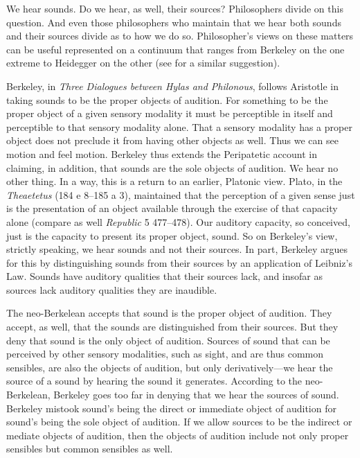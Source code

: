 We hear sounds. Do we hear, as well, their sources? Philosophers divide on this question. And even those philosophers who maintain that we hear both sounds and their sources divide as to how we do so. Philosopher's views on these matters can be useful represented on a continuum that ranges from Berkeley on the one extreme to Heidegger on the other (see \citealt{Leddington:2014aa} for a similar suggestion). 

\nocite{Berkeley:1734fk} Berkeley, in \emph{Three Dialogues between Hylas and Philonous}, follows Aristotle in taking sounds to be the proper objects of audition. For something to be the proper object of a given sensory modality it must be perceptible in itself and perceptible to that sensory modality alone. That a sensory modality has a proper object does not preclude it from having other objects as well. Thus we can see motion and feel motion. Berkeley thus extends the Peripatetic account in claiming, in addition, that sounds are the sole objects of audition. We hear no other thing. In a way, this is a return to an earlier, Platonic view. Plato, in the \emph{Theaetetus} (184 e 8--185 a 3), maintained that the perception of a given sense just is the presentation of an object available through the exercise of that capacity alone (compare as well \emph{Republic} 5 477--478). Our auditory capacity, so conceived, just is the capacity to present its proper object, sound. So on Berkeley's view, strictly speaking, we hear sounds and not their sources. In part, Berkeley argues for this by distinguishing sounds from their sources by an application of Leibniz's Law. Sounds have auditory qualities that their sources lack, and insofar as sources lack auditory qualities they are inaudible. 

The neo-Berkelean accepts that sound is the proper object of audition. They accept, as well, that the sounds are distinguished from their sources. But they deny that sound is the only object of audition. Sources of sound that can be perceived by other sensory modalities, such as sight, and are thus common sensibles, are also the objects of audition, but only derivatively---we hear the source of a sound by hearing the sound it generates. According to the neo-Berkelean, Berkeley goes too far in denying that we hear the sources of sound. Berkeley mistook sound's being the direct or immediate object of audition for sound's being the sole object of audition. If we allow sources to be the indirect or mediate objects of audition, then the objects of audition include not only proper sensibles but common sensibles as well.

